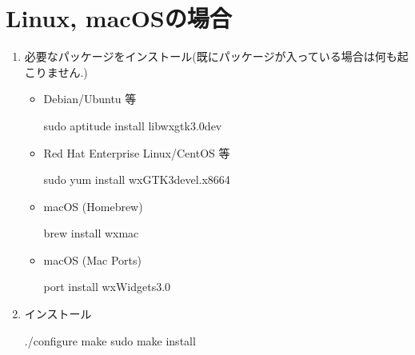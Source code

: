 \documentclass[letterpaper,10pt,dvipdfmx,openany]{sphinxmanual}
\begin{document}
\section{Linux, macOSの場合}
\label{\detokenize{install:linux-macos}}\begin{enumerate}
%
\item {} 
\sphinxAtStartPar
必要なパッケージをインストール(既にパッケージが入っている場合は何も起こりません.)
\begin{itemize}
\item {} 
\sphinxAtStartPar
Debian/Ubuntu 等

\begin{sphinxVerbatim}[commandchars=\\\{\}]
\PYGZdl{} sudo aptitude install libwxgtk3.0\PYGZhy{}dev
\end{sphinxVerbatim}

\item {} 
\sphinxAtStartPar
Red Hat Enterprise Linux/CentOS 等

\begin{sphinxVerbatim}[commandchars=\\\{\}]
\PYGZdl{} sudo yum install wxGTK3\PYGZhy{}devel.x86\PYGZus{}64
\end{sphinxVerbatim}

\item {} 
\sphinxAtStartPar
macOS (Homebrew)

\begin{sphinxVerbatim}[commandchars=\\\{\}]
\PYGZdl{} brew install wxmac
\end{sphinxVerbatim}

\item {} 
\sphinxAtStartPar
macOS (Mac Ports)

\begin{sphinxVerbatim}[commandchars=\\\{\}]
\PYGZdl{} port install wxWidgets\PYGZhy{}3.0
\end{sphinxVerbatim}

\end{itemize}

\item {} 
\sphinxAtStartPar
インストール

\begin{sphinxVerbatim}[commandchars=\\\{\}]
\PYGZdl{} ./configure
\PYGZdl{} make
\PYGZdl{} sudo make install
\end{sphinxVerbatim}

\end{enumerate}
\end{document}
